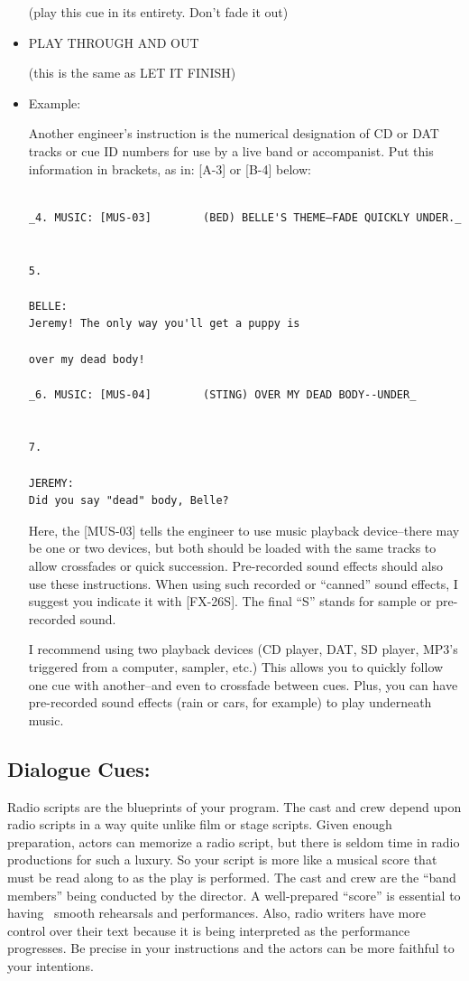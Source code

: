 \documentclass[openleft,oneside,showtrims]{memoir}
\begin{document}
\begin{itemize}
(play this cue in its entirety. Don't fade it out)

\item PLAY THROUGH AND OUT
\label{sec:orgd522b04}

(this is the same as LET IT FINISH)

\item Example:
\label{sec:orgf3d00d8}

Another engineer's instruction is the numerical designation of CD or DAT tracks or cue ID numbers for use by a live band or accompanist. Put this information in brackets, as in: [A-3] or [B-4] below:

\lstset{language=fountain,label= ,caption= ,captionpos=b,numbers=none}
\begin{lstlisting}

_4. MUSIC: [MUS-03]        (BED) BELLE'S THEME—FADE QUICKLY UNDER._


5.

BELLE:
Jeremy! The only way you'll get a puppy is
  
over my dead body!

_6. MUSIC: [MUS-04]        (STING) OVER MY DEAD BODY--UNDER_


7.

JEREMY:
Did you say "dead" body, Belle?

\end{lstlisting}

Here, the [MUS-03] tells the engineer to use music playback device--there may be one or two devices, but both should be loaded with the same tracks to allow crossfades or quick succession. Pre-recorded sound effects should also use these instructions. When using such recorded or ``canned'' sound effects, I suggest you indicate it with [FX-26S]. The final ``S'' stands for sample or pre-recorded sound.

I recommend using two playback devices (CD player, DAT, SD player, MP3's triggered from a computer, sampler, etc.) This allows you to quickly follow one cue with another--and even to crossfade between cues. Plus, you can have pre-recorded sound effects (rain or cars, for example) to play underneath music.
\end{itemize}

\subsection{Dialogue Cues:}
\label{sec:orgc29a468}
Radio scripts are the blueprints of your program. The cast and crew depend upon radio scripts in a way quite unlike film or stage scripts. Given enough preparation, actors can memorize a radio script, but there is seldom time in radio productions for such a luxury. So your script is more like a musical score that must be read along to as the play is performed. The cast and crew are the ``band members'' being conducted by the director. A well-prepared ``score'' is essential to having  smooth rehearsals and performances. Also, radio writers have more control over their text because it is being interpreted as the performance progresses. Be precise in your instructions and the actors can be more faithful to your intentions.
\end{document}
